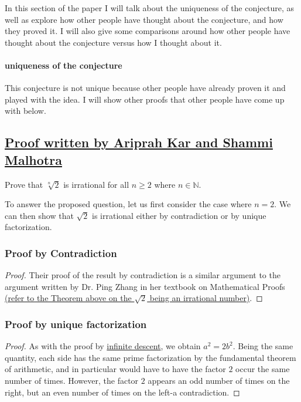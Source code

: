 \documentclass{article}
\begin{document}
In this section of the paper I will talk about the uniqueness of the conjecture, as well as explore how other people have thought about the conjecture, and how they proved it. I will also give some comparisons around how other people have thought about the conjecture versus how I thought about it. 

\paragraph{uniqueness of the conjecture}

This conjecture is not unique because other people have already proven it and played with the idea. I will show other proofs that other people have come up with below.  

\subsection{\href{https://mathsociitd.github.io/blog/2021/03/14/irrationality-of-nth-roots/}{Proof written by Ariprah Kar and Shammi Malhotra}}\cite{iit2021}   

Prove that \(\sqrt[n]{2}\) is irrational for all \(n \geq 2\) where \(n \in \mathds{N}\). 

To answer the proposed question, let us first consider the case where \(n = 2\). We can then show that \(\sqrt{2}\) is irrational either by contradiction or by unique factorization. 

\subsubsection{Proof by Contradiction} 

\begin{proof}
    Their proof of the result by contradiction is a similar argument to the argument written by Dr. Ping Zhang in her textbook on Mathematical Proofs \hyperlink{Ping Zhang's proof}{(refer to the Theorem above on the \(\sqrt{2}\) being an irrational number)}.   
\end{proof} 

\subsubsection{Proof by unique factorization}  

\begin{proof}
    As with the proof by \href{https://en.wikipedia.org/wiki/Proof_by_infinite_descent}{infinite descent}, we obtain \(a^2 = 2b^2\). Being the same quantity, each side has the same prime factorization by the fundamental theorem of arithmetic, and in particular would have to have the factor \(2\) occur the same number of times. However, the factor \(2\) appears an odd number of times on the right, but an even number of times on the left-a contradiction. 
\end{proof}
 
\end{document}
